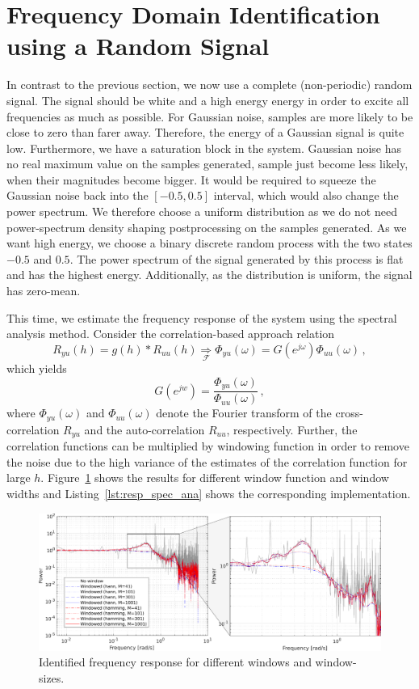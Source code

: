 \documentclass{scrartcl}
\begin{document}
\section{Frequency Domain Identification using a Random Signal}

In contrast to the previous section, we now use a complete (non-periodic) random signal.
The signal should be white and a high energy energy in order to excite all frequencies as much as possible. 
For Gaussian noise, samples are more likely to be close to zero than farer away. Therefore, the energy of a Gaussian signal is quite low.
Furthermore, we have a saturation block in the system.
Gaussian noise has no real maximum value on the samples generated, sample just become less likely, when their magnitudes become bigger.
It would be required to squeeze the Gaussian noise back into the $[-0.5, 0.5]$ interval, which would also change the power spectrum.
We therefore choose a uniform distribution as we do not need power-spectrum density shaping postprocessing on the samples generated.
As we want high energy, we choose a binary discrete random process with the two states $-0.5$ and $0.5$.
The power spectrum of the signal generated by this process is flat and has the highest energy.
Additionally, as the distribution is uniform, the signal has zero-mean.

This time, we estimate the frequency response of the system using the spectral analysis method.
Consider the correlation-based approach relation
\begin{equation}
	R_{yu}(h) = g(h) * R_{uu}(h) \underset{\mathcal{F}}{\Rightarrow} \Phi_{yu}(\omega) = G(e^{j \omega}) \Phi_{uu}(\omega)\, ,
\end{equation}
which yields
\begin{equation}
	G(e^{jw}) = \frac{\Phi_{yu}(\omega)}{\Phi_{uu}(\omega)}\, ,
\end{equation}
where $\Phi_{yu}(\omega)$ and $\Phi_{uu}(\omega)$ denote the Fourier transform of the cross-correlation $R_{yu}$ and the auto-correlation $R_{uu}$, respectively.
Further, the correlation functions can be multiplied by windowing function in order to remove the noise due to the high variance of the estimates of the correlation function for large $h$.
Figure~\ref{fig:resp_spec_ana} shows the results for different window function and window widths and Listing~\ref{lst:resp_spec_ana} shows the corresponding implementation.

\begin{figure}[h]
	\centering
	\includegraphics[width=\textwidth]{figures/freq_resp_spec_ana.pdf}
	\caption{Identified frequency response for different windows and window-sizes.}
	\label{fig:resp_spec_ana}
\end{figure}
\end{document}

